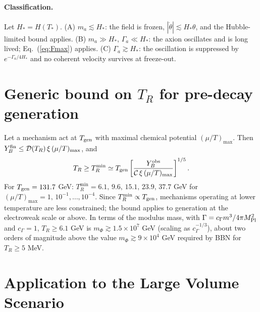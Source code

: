 \documentclass[11pt]{article}
\newcommand{\Mpl}{M_{\rm Pl}}
\begin{document}
\paragraph*{Classification.} Let $H_*=H(T_*)$. (A) $m_a\lesssim H_*$: the field is frozen, $|\dot\theta|\lesssim H_*\theta$, and the Hubble-limited bound applies. (B) $m_a\gg H_*$, $\Gamma_a\ll H_*$: the axion oscillates and is long lived; Eq.~(\ref{eq:Fmax}) applies. (C) $\Gamma_a\gtrsim H_*$: the oscillation is suppressed by $e^{-\Gamma_a/4H_*}$ and no coherent velocity survives at freeze-out.

\section{Generic bound on $T_R$ for pre-decay generation}\label{sec:generic}

Let a mechanism act at $T_{\rm gen}$ with maximal chemical potential $(\mu/T)_{\max}$. Then $Y_B^{\rm fin}\le\mathcal D(T_R)\,\xi\,(\mu/T)_{\max}$, and
\begin{equation}
T_R\ge T_R^{\min}\simeq T_{\rm gen}\left[\frac{Y_B^{\rm obs}}{\mathcal C\,\xi\,(\mu/T)_{\max}}\right]^{1/5}.
\end{equation}
For $T_{\rm gen}=131.7$ GeV: $T_R^{\min}=6.1,\,9.6,\,15.1,\,23.9,\,37.7$ GeV for $(\mu/T)_{\max}=1,\,10^{-1},\dots,10^{-4}$. Since $T_R^{\min}\propto T_{\rm gen}$, mechanisms operating at lower temperature are less constrained; the bound applies to generation at the electroweak scale or above. In terms of the modulus mass, with $\Gamma=c_\Gamma m^3/4\pi\Mpl^2$ and $c_\Gamma=1$, $T_R\ge6.1$ GeV is $m_\Phi\gtrsim1.5\times10^7$ GeV (scaling as $c_\Gamma^{-1/3}$), about two orders of magnitude above the value $m_\Phi\gtrsim9\times10^4$ GeV required by BBN for $T_R\ge5$ MeV.

\section{Application to the Large Volume Scenario}\label{sec:lvs}
\end{document}
